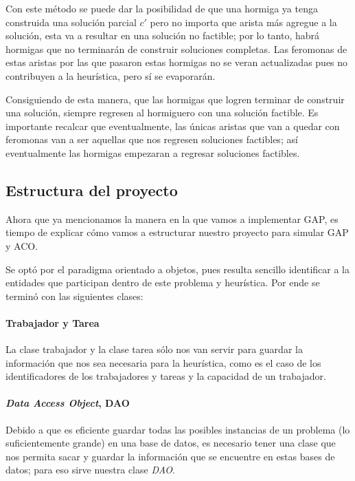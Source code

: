 \documentclass{article}
\newcommand{\tit}[1]{\textit{#1}}
\begin{document}
    Con este método se puede dar la posibilidad de que una hormiga ya 
    tenga construida una solución parcial $c'$ pero no importa 
    que arista más agregue a la solución, esta va a resultar en una 
    solución no factible; por lo tanto, habrá hormigas que no 
    terminarán de construir soluciones completas. Las feromonas de 
    estas aristas por las que pasaron estas hormigas no se veran 
    actualizadas pues no contribuyen a la heurística, pero sí 
    se evaporarán.

    Consiguiendo de esta manera, que las hormigas que logren terminar 
    de construir una solución, siempre regresen al hormiguero 
    con una solución factible. Es importante recalcar que 
    eventualmente, las únicas aristas que van a quedar con feromonas
    van a ser aquellas que nos regresen soluciones factibles; así 
    eventualmente las hormigas empezaran a regresar soluciones 
    factibles.

    \subsection{ Estructura del proyecto }
    Ahora que ya mencionamos la manera en la que vamos a implementar
    GAP, es tiempo de explicar cómo vamos a estructurar nuestro 
    proyecto para simular GAP y ACO.

    Se optó por el paradigma orientado a objetos, pues resulta sencillo
    identificar a la entidades que participan dentro de este problema
    y heurística. Por ende se terminó con las siguientes clases:

    \paragraph{ Trabajador y Tarea }
    La clase trabajador y la clase tarea sólo nos van servir para 
    guardar la información que nos sea necesaria para la heurística,
    como es el caso de los identificadores de los trabajadores y 
    tareas y la capacidad de un trabajador.

    \paragraph{ \tit{Data Access Object}, DAO }
    Debido a que es eficiente guardar todas las posibles instancias 
    de un problema (lo suficientemente grande) en una base de datos,
    es necesario tener una clase que nos permita sacar y guardar la 
    información que se encuentre en estas bases de datos; para 
    eso sirve nuestra clase \tit{DAO}.
\end{document}
